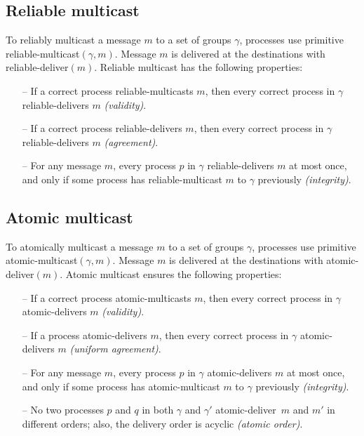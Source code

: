 \documentclass[11pt]{article}
\newcommand{\rmcast}{reliable-multicast}
\newcommand{\rmdel}{reliable-deliver}
\newcommand{\amcast}{atomic-multicast}
\newcommand{\amdel}{atomic-deliver}
\begin{document}
\subsection{Reliable multicast}
\label{sec:rmcast}

To reliably multicast a message $m$ to a set of groups $\gamma$, processes use primitive \rmcast$(\gamma, m)$.
Message $m$ is delivered at the destinations with \rmdel$(m)$.
Reliable multicast has the following properties:

\begin{itemize}

    \item[--] If a correct process \rmcast{}s $m$, then every correct process in $\gamma$ \rmdel{}s $m$ \emph{(validity)}.
    
    \item[--] If a correct process \rmdel{}s $m$, then every correct process in $\gamma$ \rmdel{}s $m$ \emph{(agreement)}.
    
    \item[--] For any message $m$, every process $p$ in $\gamma$ \rmdel{}s $m$ at most once, and only if some process has \rmcast{} $m$  to $\gamma$ previously \emph{(integrity)}.
    
\end{itemize}

\subsection{Atomic multicast}
\label{sec:amcast}

To atomically multicast a message $m$ to a set of groups $\gamma$, processes use primitive \amcast$(\gamma, m)$.
Message $m$ is delivered at the destinations with \amdel$(m)$.
Atomic multicast ensures the following properties:

\begin{itemize}
    
    \item[--] If a correct process \amcast{}s $m$, then every correct process in $\gamma$ \amdel{}s $m$ \emph{(validity)}.
    
    \item[--] If a process \amdel{}s $m$, then every correct process in $\gamma$ \amdel{}s $m$ \emph{(uniform agreement)}.
    
    \item[--] For any message $m$, every process $p$ in $\gamma$ \amdel{}s $m$ at most once, and only if some process has \amcast{} $m$ to $\gamma$ previously \emph{(integrity)}.
    
    \item[--] No two processes $p$ and $q$ in both $\gamma$ and $\gamma'$ \amdel\ $m$ and $m'$ in different orders; also, the delivery order is acyclic \emph{(atomic order)}.
    
\end{itemize}
\end{document}
